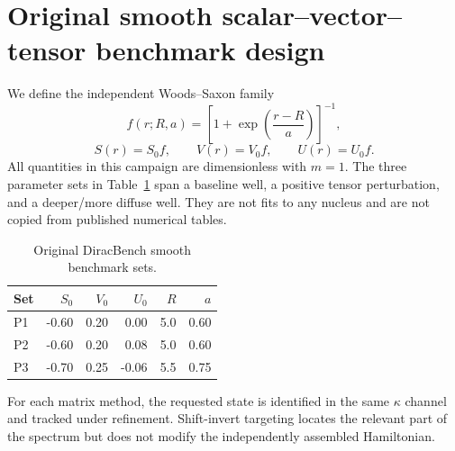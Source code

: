 \documentclass[a4paper,fleqn]{cas-dc}
\begin{document}
\section{Original smooth scalar--vector--tensor benchmark design}
We define the independent Woods--Saxon family
\begin{equation} f(r;R,a)=\left[1+\exp\left(\frac{r-R}{a}\right)\right]^{-1}, \end{equation}
\begin{equation} S(r)=S_0f,\qquad V(r)=V_0f,\qquad U(r)=U_0f. \label{eq:wsbench}\end{equation}
All quantities in this campaign are dimensionless with $m=1$. The three parameter sets in Table~\ref{tab:paramsets} span a baseline well, a positive tensor perturbation, and a deeper/more diffuse well. They are not fits to any nucleus and are not copied from published numerical tables.
\begin{table}[t]\centering\caption{Original DiracBench smooth benchmark sets.}\label{tab:paramsets}\begin{tabular}{lrrrrr}\toprule Set & $S_0$ & $V_0$ & $U_0$ & $R$ & $a$\\\midrule P1&-0.60&0.20&0.00&5.0&0.60\\ P2&-0.60&0.20&0.08&5.0&0.60\\ P3&-0.70&0.25&-0.06&5.5&0.75\\\bottomrule\end{tabular}\end{table}
For each matrix method, the requested state is identified in the same $\kappa$ channel and tracked under refinement. Shift-invert targeting locates the relevant part of the spectrum but does not modify the independently assembled Hamiltonian.
\end{document}

